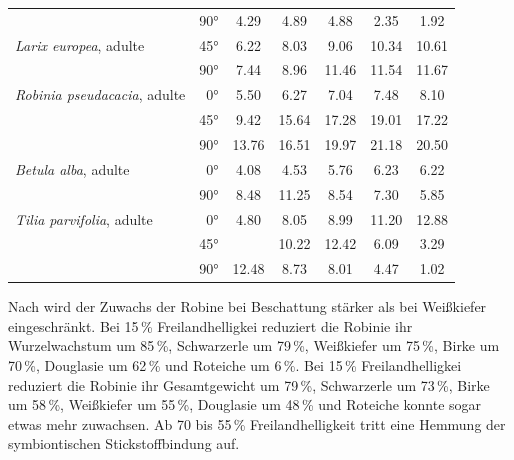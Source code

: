 \documentclass[twocolumn]{scrartcl}
\begin{document}
\begin{table}[htbp]
{\begin{tabular}{lc*{5}{S[table-format=2.2]}}
                                             & 90°        & 4.29 & 4.89 & 4.88 & 2.35 & 1.92 \\[.3em]
\textit{Larix europea}, adulte               & 45°        & 6.22 & 8.03 & 9.06 & 10.34 & 10.61 \\
                                             & 90°        & 7.44 & 8.96 & 11.46 & 11.54 & 11.67 \\[.3em]
\textit{Robinia pseudacacia}, adulte         & ~0°        & 5.50 & 6.27 & 7.04 & 7.48 & 8.10 \\
                                             & 45°        & 9.42 & 15.64 & 17.28 & 19.01 & 17.22 \\
                                             & 90°        & 13.76 & 16.51 & 19.97 & 21.18 & 20.50 \\[.3em]
\textit{Betula alba}, adulte                 & ~0°        & 4.08 & 4.53 & 5.76 & 6.23 & 6.22 \\
                                             & 90°        & 8.48 & 11.25 & 8.54 & 7.30 & 5.85 \\[.3em]
\textit{Tilia parvifolia}, adulte            & ~0°        & 4.80 & 8.05 & 8.99 & 11.20 & 12.88 \\
                                             & 45°        & {}   & 10.22 & 12.42 & 6.09 & 3.29 \\
                                             & 90°        & 12.48 & 8.73 & 8.01 & 4.47 & 1.02 \\
\bottomrule
\end{tabular}}
    \label{tab:nppTempWinkel}
\end{table}

Nach \citet{lyr1963beschattung,lyr1964beschattung} wird der Zuwachs der Robine bei Beschattung stärker als bei Weißkiefer eingeschränkt. Bei 15\,\% Freilandhelligkei reduziert die Robinie ihr Wurzelwachstum um 85\,\%, Schwarzerle um 79\,\%, Weißkiefer um 75\,\%, Birke um 70\,\%, Douglasie um 62\,\% und Roteiche um 6\,\%.  Bei 15\,\% Freilandhelligkei reduziert die Robinie ihr Gesamtgewicht um 79\,\%, Schwarzerle um 73\,\%, Birke um 58\,\%, Weißkiefer um 55\,\%, Douglasie um 48\,\% und Roteiche konnte sogar etwas mehr zuwachsen. Ab 70 bis 55\,\% Freilandhelligkeit tritt eine Hemmung der symbiontischen Stickstoffbindung auf.
\end{document}
